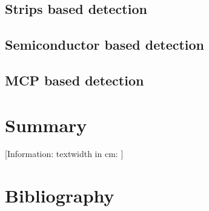\begin{refsection}
	\subsection{Strips based detection}
	\subsection{Semiconductor based detection}
  \subsection{MCP based detection}
  
	\section{Summary}
	\label{ch3:Summary}
	[Information: textwidth in cm: \prntlen{\textwidth}]

	
	
	
	

	\cleardoublepage
	\section{Bibliography}
	\label{ch3:bib}
	\printbibliography[heading=subbibliography]

\end{refsection}